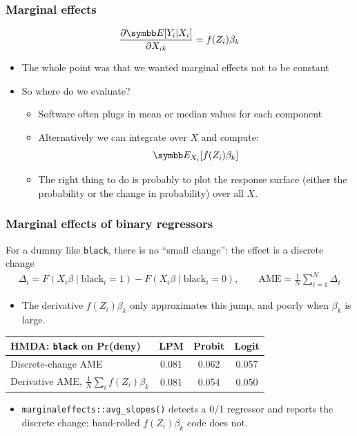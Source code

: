 \documentclass[aspectratio=169,11pt]{beamer}
\begin{document}
\begin{frame}
\frametitle{Marginal effects}
\begin{align*}
\frac{\partial \E[Y_i | X_i] }{\partial X_{ik}} = f (Z_i) \beta_k
\end{align*}
\begin{itemize}
\item The whole point was that we wanted marginal effects not to be constant
\item So where do we evaluate?
\begin{itemize}
\item Software often plugs in mean or median values for each component
\item Alternatively we can integrate over $X$ and compute:
$$
\E_{X_i}[ f (Z_i) \beta_k]
$$
\item The right thing to do is probably to plot the response surface (either the probability or the change in probability) over all $X$.
\end{itemize}
\end{itemize}
\end{frame}


\begin{frame}
\frametitle{Marginal effects of binary regressors}
\small
For a dummy like \texttt{black}, there is no ``small change'': the effect is a \alert{discrete change}
\begin{align*}
\Delta_i = F\left(X_i\beta \mid \text{black}_i=1\right) - F\left(X_i\beta \mid \text{black}_i=0\right),
\qquad \text{AME} = \frac{1}{N}\sum_{i=1}^N \Delta_i
\end{align*}
\begin{itemize}
\item The derivative $f(Z_i)\beta_k$ only approximates this jump, and poorly when $\beta_k$ is large.
\end{itemize}
\begin{center}
\begin{tabular}{lccc}
\toprule
 HMDA: \texttt{black} on Pr(deny) & LPM & Probit & Logit \\
\midrule
Discrete-change AME & 0.081 & 0.062 & 0.057 \\
Derivative AME, $\frac{1}{N}\sum_i f(Z_i)\beta_k$ & 0.081 & 0.054 & 0.050 \\
\bottomrule
\end{tabular}
\end{center}
\begin{itemize}
\item \texttt{marginaleffects::avg\_slopes()} detects a 0/1 regressor and reports the discrete change; hand-rolled $f(Z_i)\beta_k$ code does not.
\end{itemize}
\end{frame}
\end{document}
